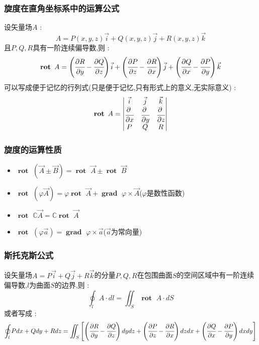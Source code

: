 \documentclass[UTF8,12pt]{ctexbook}
\newcommand{\mathConstant}{\mathbb{C}}
\newcommand{\bigCase}[1]{\left(#1\right)}
\newcommand{\partialDerivativeFrac}[2]{\cfrac{\partial #1}{\partial #2}}
\newcommand{\mediumBigCase}[1]{\left[#1\right]}
\newcommand{\curveIntegralOnLine}[1]{\oint_{#1}}
\newcommand{\surfaceIntegralOnSurface}[1]{\iint_{#1}}
\DeclareMathOperator{\curlRotText}{\mathbf{rot}\ }
\DeclareMathOperator{\gradText}{\mathbf{grad}\ }
\begin{document}
{{{{    \subsubsection{旋度在直角坐标系中的运算公式}{
      设矢量场$A$ : $$
        A = P(x,y,z)\vec{i} + Q(x,y,z)\vec{j} + R(x,y,z)\vec{k}
      $$
      且$P,Q,R$具有一阶连续偏导数,则 : $$
        \curlRotText A = \bigCase{\partialDerivativeFrac{R}{y} - \partialDerivativeFrac{Q}{z}}\vec{i} + \bigCase{\partialDerivativeFrac{P}{z} - \partialDerivativeFrac{R}{x}}\vec{j} + \bigCase{\partialDerivativeFrac{Q}{x} - \partialDerivativeFrac{P}{y}}\vec{k}
      $$
      可以写成便于记忆的行列式(只是便于记忆,只有形式上的意义,无实际意义) : $$
        \curlRotText A = \begin{vmatrix}
          \vec{i}                       & \vec{j}                       & \vec{k}                       \\
          \partialDerivativeFrac{\ }{x} & \partialDerivativeFrac{\ }{y} & \partialDerivativeFrac{\ }{z} \\
          P                             & Q                             & R
        \end{vmatrix}
      $$
    }%

    \subsubsection{旋度的运算性质}{
      \begin{itemize}
        \item $\curlRotText (\vec{A} \pm \vec{B}) = \curlRotText \vec{A} \pm \curlRotText \vec{B}$
        \item $\curlRotText (\varphi \vec{A}) = \varphi \curlRotText \vec{A} + \gradText \varphi \times \vec{A}$($\varphi$是数性函数)
        \item $\curlRotText \mathConstant \vec{A} = \mathConstant \curlRotText \vec{A}$
        \item $\curlRotText (\varphi \vec{a}) = \gradText \varphi \times \vec{a}$($\vec{a}$为常向量)
      \end{itemize}
    }%

    \subsubsection{斯托克斯公式}{
      设矢量场$A = P\vec{i} + Q\vec{j} + R\vec{k}$的分量$P,Q,R$在包围曲面$S$的空间区域中有一阶连续偏导数,$l$为曲面$S$的边界,则 : $$
        \curveIntegralOnLine{l}A \cdot dl = \surfaceIntegralOnSurface{S}\curlRotText A\cdot dS
      $$
      或者写成 : $$
        \curveIntegralOnLine{l}Pdx + Qdy + Rdz = \surfaceIntegralOnSurface{S}\mediumBigCase{\bigCase{\partialDerivativeFrac{R}{y} - \partialDerivativeFrac{Q}{z}}dydz + \bigCase{\partialDerivativeFrac{P}{z} - \partialDerivativeFrac{R}{x}}dzdx + \bigCase{\partialDerivativeFrac{Q}{x} - \partialDerivativeFrac{P}{y}}dxdy}
      $$

}}}}}
\end{document}
